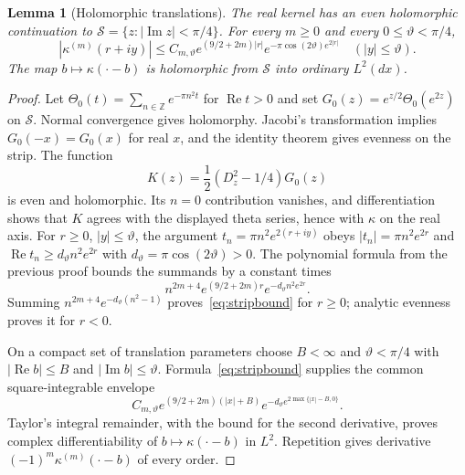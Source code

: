 \documentclass[11pt,a4paper]{article}
\numberwithin{equation}{section}
\newtheorem{lemma}[theorem]{Lemma}
\theoremstyle{remark}
\begin{document}
\begin{lemma}[Holomorphic translations]\label{lem:strip}
The real kernel has an even holomorphic continuation to
$\mathcal S=\{z:|\operatorname{Im}z|<\pi/4\}$. For every $m\ge0$ and every $0\le\vartheta<\pi/4$,
\begin{equation}\label{eq:stripbound}
 |\kappa^{(m)}(r+iy)|\le C_{m,\vartheta}
 e^{(9/2+2m)|r|}
 e^{-\pi\cos(2\vartheta)e^{2|r|}}
 \quad(|y|\le\vartheta).
\end{equation}
The map $b\mapsto\kappa(\cdot-b)$ is holomorphic from $\mathcal S$ into ordinary $L^2(dx)$.
\end{lemma}
\begin{proof}
Let $\Theta_0(t)=\sum_{n\in\mathbb Z}e^{-\pi n^2t}$ for $\operatorname{Re}t>0$ and set
$G_0(z)=e^{z/2}\Theta_0(e^{2z})$ on $\mathcal S$. Normal convergence gives holomorphy. Jacobi's transformation implies $G_0(-x)=G_0(x)$ for real $x$, and the identity theorem gives evenness on the strip. The function
\[
 K(z)=\frac12(D_z^2-1/4)G_0(z)
\]
is even and holomorphic. Its $n=0$ contribution vanishes, and differentiation shows that $K$ agrees with the displayed theta series, hence with $\kappa$ on the real axis.
For $r\ge0$, $|y|\le\vartheta$, the argument
$t_n=\pi n^2e^{2(r+iy)}$ obeys
$|t_n|=\pi n^2e^{2r}$ and
$\operatorname{Re}t_n\ge d_\vartheta n^2e^{2r}$ with
$d_\vartheta=\pi\cos(2\vartheta)>0$. The polynomial formula from the previous proof bounds the summands by a constant times
\[
 n^{2m+4}e^{(9/2+2m)r}e^{-d_\vartheta n^2e^{2r}}.
\]
Summing $n^{2m+4}e^{-d_\vartheta(n^2-1)}$ proves~\eqref{eq:stripbound} for $r\ge0$; analytic evenness proves it for $r<0$.

On a compact set of translation parameters choose $B<\infty$ and $\vartheta<\pi/4$ with $|\operatorname{Re}b|\le B$ and $|\operatorname{Im}b|\le\vartheta$. Formula~\eqref{eq:stripbound} supplies the common square-integrable envelope
\[
 C_{m,\vartheta}e^{(9/2+2m)(|x|+B)}
       e^{-d_\vartheta e^{2\max\{|x|-B,0\}}}.
\]
Taylor's integral remainder, with the bound for the second derivative, proves complex differentiability of $b\mapsto\kappa(\cdot-b)$ in $L^2$. Repetition gives derivative $(-1)^m\kappa^{(m)}(\cdot-b)$ of every order.
\end{proof}
\end{document}
